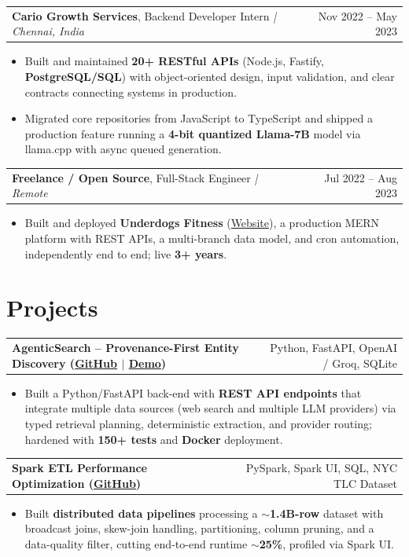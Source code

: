 \documentclass[letterpaper,11pt]{article}
\makeatletter
\newcommand{\expItem}[4]{%
  \vspace{3pt}
  \begin{tabular*}{\textwidth}{@{}l@{\extracolsep{\fill}}r@{}}
    \textbf{#1}, #2 \textit{| #3} & #4 \\
  \end{tabular*}\par\vspace{-2pt}
}
\newcommand{\projItem}[2]{%
  \vspace{6pt}
  \begin{tabular*}{\textwidth}{@{}l@{\extracolsep{\fill}}r@{}}
    \textbf{#1} & #2 \\
  \end{tabular*}\par\vspace{-2pt}
}
\makeatother
\begin{document}
\expItem{Cario Growth Services}{Backend Developer Intern}{Chennai, India}{Nov 2022 -- May 2023}
\begin{itemize}
  \item Built and maintained \textbf{20+ RESTful APIs} (Node.js, Fastify, \textbf{PostgreSQL/SQL}) with object-oriented design, input validation, and clear contracts connecting systems in production.
  \item Migrated core repositories from JavaScript to TypeScript and shipped a production feature running a \textbf{4-bit quantized Llama-7B} model via llama.cpp with async queued generation.
\end{itemize}

\expItem{Freelance / Open Source}{Full-Stack Engineer}{Remote}{Jul 2022 -- Aug 2023}
\begin{itemize}
  \item Built and deployed \textbf{Underdogs Fitness} (\href{https://www.underdogsfitness.in/}{Website}), a production MERN platform with REST APIs, a multi-branch data model, and cron automation, independently end to end; live \textbf{3+ years}.
\end{itemize}

\section{Projects}

\projItem{AgenticSearch -- Provenance-First Entity Discovery {\normalfont\small(\href{https://github.com/Deva-1903/ciir_agentic_search}{GitHub} $\vert$ \href{https://agentic-search-negglszkwa-uc.a.run.app}{Demo})}}{Python, FastAPI, OpenAI / Groq, SQLite}
\begin{itemize}
  \item Built a Python/FastAPI back-end with \textbf{REST API endpoints} that integrate multiple data sources (web search and multiple LLM providers) via typed retrieval planning, deterministic extraction, and provider routing; hardened with \textbf{150+ tests} and \textbf{Docker} deployment.
\end{itemize}

\projItem{Spark ETL Performance Optimization {\normalfont\small(\href{https://github.com/Deva-1903/Spark-ETL-Optimization}{GitHub})}}{PySpark, Spark UI, SQL, NYC TLC Dataset}
\begin{itemize}
  \item Built \textbf{distributed data pipelines} processing a \textbf{$\sim$1.4B-row} dataset with broadcast joins, skew-join handling, partitioning, column pruning, and a data-quality filter, cutting end-to-end runtime \textbf{$\sim$25\%}, profiled via Spark UI.
\end{itemize}
\end{document}
